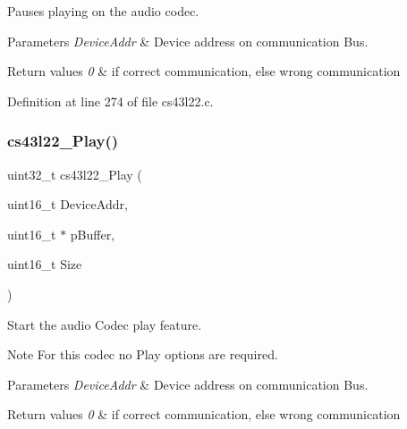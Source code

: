 Pauses playing on the audio codec. 


\begin{DoxyParams}{Parameters}
{\em Device\+Addr} & Device address on communication Bus. \\
\hline
\end{DoxyParams}

\begin{DoxyRetVals}{Return values}
{\em 0} & if correct communication, else wrong communication \\
\hline
\end{DoxyRetVals}


Definition at line 274 of file cs43l22.\+c.

\mbox{\label{group___c_s43_l22___private___functions_ga1a210c3782b3d56db00565d4699f4c89}} 
\subsubsection{\texorpdfstring{cs43l22\+\_\+\+Play()}{cs43l22\_Play()}}
{\footnotesize\ttfamily uint32\+\_\+t cs43l22\+\_\+\+Play (\begin{DoxyParamCaption}\item[{uint16\+\_\+t}]{Device\+Addr,  }\item[{uint16\+\_\+t $\ast$}]{p\+Buffer,  }\item[{uint16\+\_\+t}]{Size }\end{DoxyParamCaption})}



Start the audio Codec play feature. 

\begin{DoxyNote}{Note}
For this codec no Play options are required. 
\end{DoxyNote}

\begin{DoxyParams}{Parameters}
{\em Device\+Addr} & Device address on communication Bus. ~\newline
\\
\hline
\end{DoxyParams}

\begin{DoxyRetVals}{Return values}
{\em 0} & if correct communication, else wrong communication \\
\hline
\end{DoxyRetVals}


